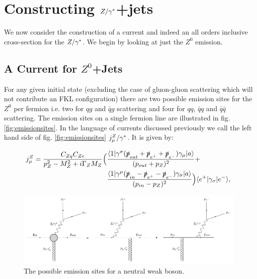 \section{Constructing $Z/\gamma^*$+jets}
	\label{sec:Zcurrents}

	We now consider the construction of a current and indeed an all orders
	inclusive cross-section for the $Z/\gamma^*$.  We begin by looking at just
	the $Z^0$ emission.

	\subsection{A Current for $Z^0$+Jets}
		\label{sub:zCurrent}

		For any given initial state (excluding the case of gluon-gluon scattering which will
		not contribute an FKL configuration) there are two possible emission sites for the
		$Z^0$ per fermion i.e. two for $qg$ and $\bar qg$ scattering and four for $qq$,
		$\bar qq$ and $\bar q\bar q$ scattering. The emission sites on a single fermion line
		are illustrated in fig. \eqref{fig:emissionsites}.  In the language of currents discussed
		previously we call the left hand side of fig. \eqref{fig:emissionsites} $j_\mu^Z/\gamma^*$.
		It is given by:

		\begin{align}
		  \begin{split}
		    j^Z_\mu = \frac{C_{Zq}C_{Ze}}{p_Z^2 - M^2_Z +
		      i\Gamma_ZM_Z}\Big(&\frac{\langle 1 | \gamma^{\sigma}(\slashed p_{out} + \slashed
		        p_{e^+} + \slashed p_{e^-})\gamma_{\mu} | a \rangle}{(p_{out} + p_Z)^2} + \\
		    &\frac{\langle 1 | \gamma^{\mu}(\slashed p_{in} - \slashed p_{e^+} - \slashed
		        p_{e^-})\gamma_{\sigma} | a \rangle}{(p_{in} - p_Z)^2}\Big)\langle e^+ | \gamma_{\sigma} | e^- \rangle,
		    \label{eqn:Zcurrent}
		  \end{split}
		\end{align}

		\begin{figure}[bt]
			\includegraphics[width=0.98\linewidth]{figures/EmissionSites.pdf}
			\caption{The possible emission sites for a neutral weak boson.}
			\label{fig:emissionsites}
		\end{figure}

